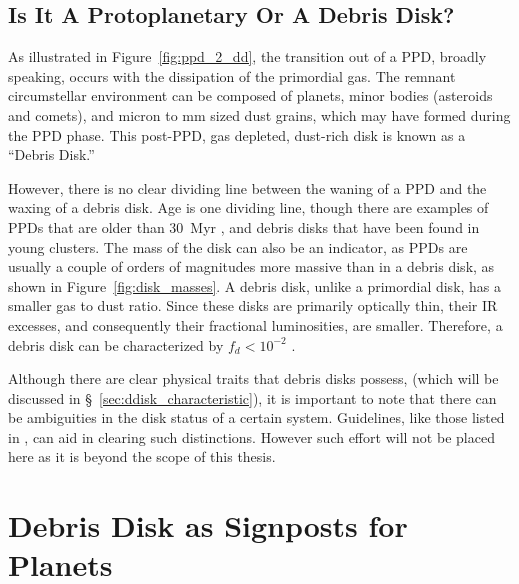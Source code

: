         
    \subsection{Is It A Protoplanetary Or A Debris Disk?}
    
    As illustrated in Figure~\ref{fig:ppd_2_dd}, the transition out of a PPD, broadly speaking, occurs with the dissipation of the primordial gas. The remnant circumstellar environment can be composed of planets, minor bodies (asteroids and comets), and micron to mm sized dust grains, which may have formed during the PPD phase. This post-PPD, gas depleted, dust-rich disk is known as a ``Debris Disk.'' %
    
    However, there is no clear dividing line between the waning of a PPD and the waxing of a debris disk. Age is one dividing line, though there are examples of PPDs that are older than 30~Myr \citep{DeMarchi2013,Scicluna2014}, and debris disks that have been found in young clusters. The mass of the disk can also be an indicator, as PPDs are usually a couple of orders of magnitudes more massive than in a debris disk, as shown in Figure~\ref{fig:disk_masses}. A debris disk, unlike a primordial disk, has a smaller gas to dust ratio. Since these disks are primarily optically thin, their IR excesses, and consequently their fractional luminosities, are smaller. Therefore, a debris disk can be characterized by $f_d<10^{-2}$ \citep{Zuckerman2001, Wyatt2008}. 
    
    Although there are clear physical traits that debris disks possess, (which will be discussed in  \S~\ref{sec:ddisk_characteristic}), it is important to note that there can be ambiguities in the disk status of a certain system. Guidelines, like those listed in \citet{Wyatt2015}, can aid in clearing such distinctions. However such effort will not be placed here as it is beyond the scope of this thesis.
    
    
\section{Debris Disk as Signposts for Planets} \label{sec:disks_signposts_planets}
    
